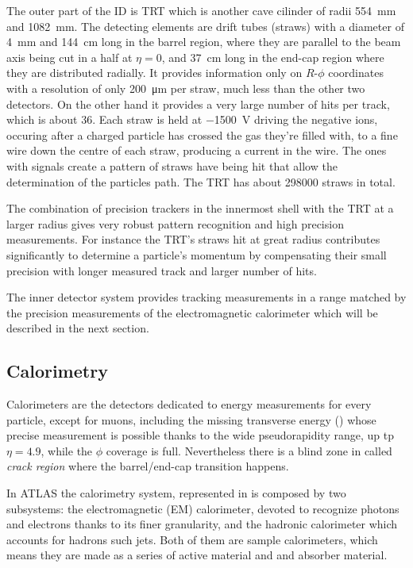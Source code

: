The outer part of the ID is TRT which is another cave cilinder of radii \SI{554}{\mm} and \SI{1082}{\mm}. The detecting elements are drift tubes (straws) with a diameter of \SI{4}{mm} and \SI{144}{cm} long in the barrel region, where they are parallel to the beam axis being cut in a half at $\eta =0$, and \SI{37}{\cm} long in the end-cap region where they are distributed radially. It provides information only on $R$-$\phi$ coordinates with a resolution of  only \SI{200}{\um} per straw, much less than the other two detectors. On the other hand it provides a very large number of hits per track, which is about \num{36}. Each straw is held at \SI{-1500}{\V} driving the negative ions, occuring after a charged particle has crossed the gas they're filled with, to a fine wire down the centre of each straw, producing a current in the wire. The ones with signals create a pattern of straws have being hit that allow the determination of the particles path. The TRT has about \num{298000} straws in total.

The combination of precision trackers in the innermost shell with the TRT at a larger radius gives very robust pattern recognition and high precision measurements. For instance the TRT's straws hit at great radius contributes significantly to determine a particle's momentum by compensating their small precision with longer measured track and larger number of hits.

The inner detector system provides tracking measurements in a range matched by the precision measurements of the electromagnetic calorimeter which will be described in the next section.

\subsection{Calorimetry}
\label{sec:calo}
Calorimeters are the detectors dedicated to energy measurements for every particle, except for muons, including the missing transverse energy (\met) whose precise measurement is possible thanks to the wide pseudorapidity range, up tp $\eta=4.9$, while the $\phi$ coverage is full. Nevertheless there is a blind zone in  called \emph{crack region} where the barrel/end-cap transition happens.

In ATLAS the calorimetry system, represented in \Fig{\ref{fig:Calos}} is composed by two subsystems: the electromagnetic (EM) calorimeter, devoted to recognize photons and electrons thanks to its finer granularity, and the hadronic calorimeter which accounts for hadrons such jets. Both of them are sample calorimeters, which means they are made as a series of active material and and absorber material.

